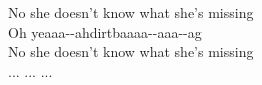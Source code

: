 No she doesn’t know what she’s missing\\
Oh yeaaa--ahdirtbaaaa--aaa--ag\\
No she doesn’t know what she’s missing\\
 ...  ...  ... \\
  \\
\\

